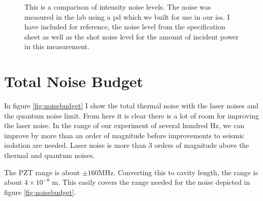 \begin{figure}
  \caption[Intensity Noise]{This is a comparison of intensity noise
    levels. The noise was measured in the lab using a \ac{pd} which
    we built for use in our \ac{iss}. I have included for reference, the
    noise level from the specification sheet as well as the shot noise
    level for the amount of incident power in this measurement.
    }
  \label{fig:intensitynoise}
\end{figure}

\section{Total Noise Budget}

In figure \ref{fig:noisebudget} I show the total thermal noise with the laser
noises and the quantum noise limit. From here it is clear there is a lot of
room for improving the laser noise. In the range of our experiment of several
hundred Hz, we can improve by more than an order of magnitude before
improvements to seismic isolation are needed. Laser noise is more than 3 orders
of magnitude above the thermal and quantum noises.

The PZT range is about $\pm 160\mathrm{MHz}$.
Converting this to cavity length, the range is about $4\times10^{-8}$ m.
This easily covers the range needed for the noise depicted in figure
\ref{fig:noisebudget}.


